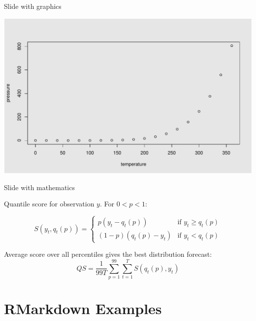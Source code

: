 \documentclass[14pt,ignorenonframetext,compress]{beamer}
\begin{document}
\begin{frame}{Slide with graphics}
\protect\hypertarget{slide-with-graphics}{}

\includegraphics{Introduction_files/figure-beamer/pressure-1.pdf}

\end{frame}

\begin{frame}{Slide with mathematics}
\protect\hypertarget{slide-with-mathematics}{}

Quantile score for observation \(y\). For \(0<p<1\):

\begin{block}{}
  \[
    S(y_t,q_t(p)) = \left\{
      \begin{array}{rl}
            p(y_t-q_t(p)) & \text{if $y_t \ge q_t(p)$}\\
        (1-p)(q_t(p)-y_t) & \text{if $y_t < q_t(p)$}
      \end{array}\right.
  \]
\end{block}

Average score over all percentiles gives the best distribution forecast:
\[
  QS = \frac{1}{99T}\sum_{p=1}^{99}\sum_{t=1}^T S(q_t(p),y_t)
\]

\end{frame}

\hypertarget{rmarkdown-examples}{%
\section{RMarkdown Examples}\label{rmarkdown-examples}}
\end{document}

